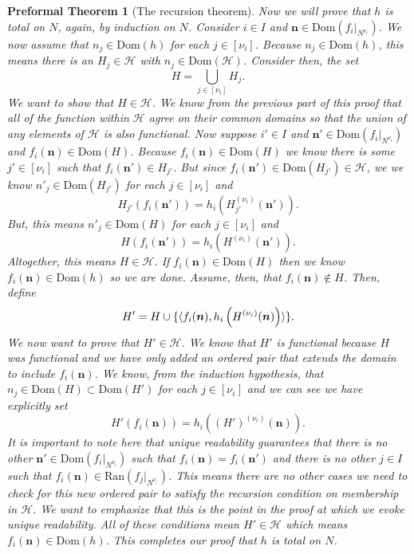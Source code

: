 \documentclass[oneside, 12pt]{book}
\theoremstyle{break}
\newtheorem{preformal definition}[definition]{Preformal Definition}
\newtheorem{preformal theorem}[theorem]{Preformal Theorem}
\newcommand{\bv}[1]{\boldsymbol{#1}}
\newcommand{\mc}[1]{\mathcal{#1}}
\begin{document}
\begin{preformal theorem}[The recursion theorem]
				Now we will prove that $h$ is total on $N$, again, by induction on $N$.
				Consider $i\in I$ and $\bv{n} \in \text{Dom}(f_i|_{N^{\nu_i}})$.
				We now assume that $n_j \in \text{Dom}(h)$ for each $j \in [\nu_i]$.
				Because $n_j \in \text{Dom}(h)$, this means there is an $H_j \in \mc{H}$ with $n_j \in \text{Dom}(\mc{H})$.
				Consider then, the set
				\begin{equation*}
					H = \bigcup_{j\in [\nu_i]} H_j.
				\end{equation*}
				We want to show that $H \in \mc{H}$.
				We know from the previous part of this proof that all of the function within $\mc{H}$ agree on their common domains so that the union of any elements of $\mc{H}$ is also functional.
				Now suppose $i'\in I$ and $\bv{n}' \in \text{Dom}(f_i|_{N^{\nu_i}})$ and $f_i(\bv{n}) \in \text{Dom}(H)$.
				Because $f_i(\bv{n}) \in \text{Dom}(H)$ we know there is some $j' \in [\nu_i]$ such that $f_i(\bv{n}') \in H_{j'}$.
				But since $f_i(\bv{n}') \in \text{Dom}(H_{j'})\in \mc{H}$, we we know $n'_j \in \text{Dom}(H_{j'})$ for each $j \in [\nu_i]$ and 
				\begin{equation*}
					H_{j'}(f_i(\bv{n}')) = h_i\left(H_{j'}^{(\nu_i)}(\bv{n}')\right).
				\end{equation*}
				But, this means $n'_j \in \text{Dom}(H)$ for each $j\in [\nu_i]$ and
				\begin{equation*}
					H(f_i(\bv{n}')) = h_i\left(H^{(\nu_i)}(\bv{n}')\right).
				\end{equation*}
				Altogether, this means $H\in \mc{H}$.
				If $f_i(\bv{n}) \in \text{Dom}(H)$ then we know $f_i(\bv{n}) \in \text{Dom}(h)$ so we are done.
				Assume, then, that $f_i(\bv{n}) \not \in H$.
				Then, define
				\begin{equation*}
					H' = H \cup \{\braket{f_i(\bv{n}), h_i\left(H^{(\nu_i)}(\bv{n})\right)}\}.
				\end{equation*}
				We now want to prove that $H' \in \mc{H}$.
				We know that $H'$ is functional because $H$ was functional and we have only added an ordered pair that extends the domain to include $f_i(\bv{n})$.
				We know, from the induction hypothesis, that $n_j \in \text{Dom}(H) \subset \text{Dom}(H')$ for each $j\in [\nu_i]$ and we can see we have explicitly set
				\begin{equation*}
					H'(f_i(\bv{n})) = h_i\left((H')^{(\nu_i)}(\bv{n})\right).
				\end{equation*}
				It is important to note here that unique readability guarantees that there is no other $\bv{n}' \in \text{Dom}(f_i|_{N^{\nu_i}})$ such that $f_i(\bv{n}) = f_i(\bv{n}')$ and there is no other $j\in I$ such that $f_i(\bv{n}) \in \text{Ran}(f_j|_{N^{\nu_i}})$.
				This means there are no other cases we need to check for this new ordered pair to satisfy the recursion condition on membership in $\mc{H}$.
				We want to emphasize that this is the point in the proof at which we evoke unique readability.
				All of these conditions mean $H' \in \mc{H}$ which means $f_i(\bv{n}) \in \text{Dom}(h)$.
				This completes our proof that $h$ is total on $N$.
				

\end{preformal theorem}
\end{document}
